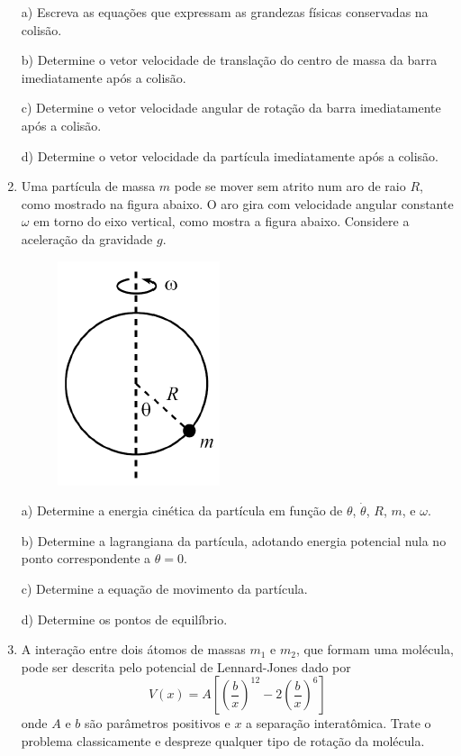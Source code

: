 \begin{enumerate}[start=1,label={\bfseries Q\arabic*.}]
a) Escreva as equações que expressam as grandezas físicas conservadas na colisão.

\resposta

b) Determine o vetor velocidade de translação do centro de massa da barra imediatamente após a colisão.

\resposta

c) Determine o vetor velocidade angular de rotação da barra imediatamente após a colisão.

\resposta

d) Determine o vetor velocidade da partícula imediatamente após a colisão.

\resposta


\item Uma partícula de massa $m$ pode se mover sem atrito num aro de raio $R$, como mostrado na figura abaixo. O aro gira com velocidade angular constante $\omega$ em torno do eixo vertical, como mostra a figura abaixo. Considere a aceleração da gravidade $g$.
\begin{figure}[H]
\centering
\includegraphics[scale=0.7]{classica-img/particula2.png}
\end{figure}

a) Determine a energia cinética da partícula em função de $\theta$, $\dot{\theta}$, $R$, $m$, e $\omega$.

\resposta

b) Determine a lagrangiana da partícula, adotando energia potencial nula no ponto correspondente a $\theta = 0$.

\resposta

c) Determine a equação de movimento da partícula.

\resposta

d) Determine os pontos de equilíbrio.

\resposta


\item A interação entre dois átomos de massas $m_{1}$ e $m_{2}$, que formam uma molécula, pode ser descrita pelo potencial de Lennard-Jones dado por
$$
V(x) = A \left[ \left( \frac{b}{x} \right)^{12} - 2 \left( \frac{b}{x} \right)^{6} \right]
$$
onde $A$ e $b$ são parâmetros positivos e $x$ a separação interatômica. Trate o problema classicamente e despreze qualquer tipo de rotação da molécula.


\end{enumerate}

